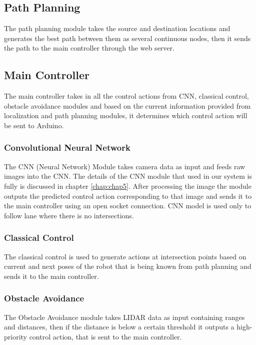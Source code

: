 \subsection{Path Planning}
\hspace{2cm}The path planning module takes the source and destination locations and generates the best path between them as several continuous nodes, then it sends the path to the main controller through the web server.

\subsection{Main Controller}
 \hspace{2cm}The main controller takes in all the control actions from CNN, classical control, obstacle avoidance modules and based on the current information provided from localization and path planning modules, it determines which control action will be sent to Arduino. 

\subsubsection{Convolutional Neural Network}
\hspace{2cm}The CNN (Neural Network) Module takes camera data as input and feeds raw images into the CNN. The details of the CNN module that used in our system is fully is discussed in chapter \ref{chap:chap5}. After processing the image the module outputs the predicted control action corresponding to that image and sends it to the main controller using an open socket connection. CNN model is used only to follow lane where there is no intersections.

\subsubsection{Classical Control}
\hspace{2cm}The classical control is used to generate actions at intersection points based on current and next poses of the robot that is being known from path planning and sends it to the main controller.

\subsubsection{Obstacle Avoidance}
\hspace{2cm}The Obstacle Avoidance module takes LIDAR data as input containing ranges and distances, then if the distance is below a certain threshold it outputs a high-priority control action, that is sent to the main controller.

